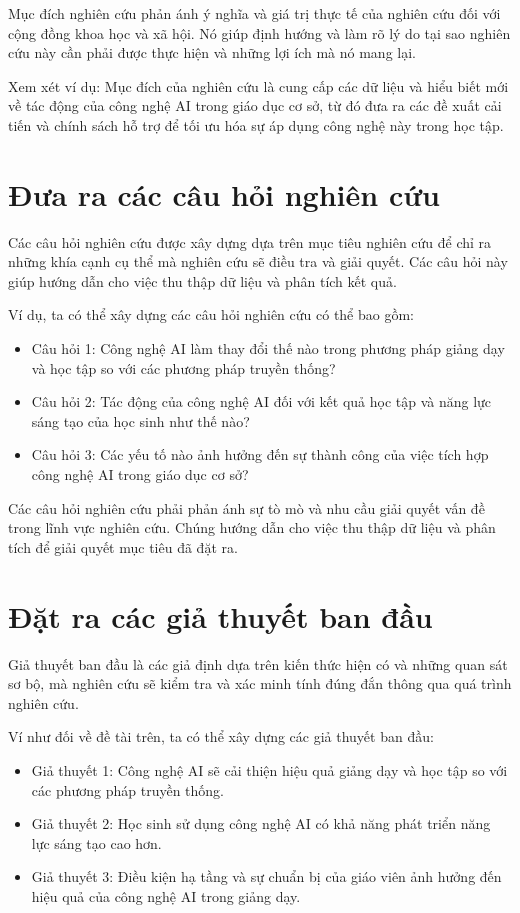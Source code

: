 Mục đích nghiên cứu phản ánh ý nghĩa và giá trị thực tế của nghiên cứu đối với cộng đồng khoa học và xã hội. Nó giúp định hướng và làm rõ lý do tại sao nghiên cứu này cần phải được thực hiện và những lợi ích mà nó mang lại.

Xem xét ví dụ: Mục đích của nghiên cứu là cung cấp các dữ liệu và hiểu biết mới về tác động của công nghệ AI trong giáo dục cơ sở, từ đó đưa ra các đề xuất cải tiến và chính sách hỗ trợ để tối ưu hóa sự áp dụng công nghệ này trong học tập. 

\section{Đưa ra các câu hỏi nghiên cứu}

Các câu hỏi nghiên cứu được xây dựng dựa trên mục tiêu nghiên cứu để chỉ ra những khía cạnh cụ thể mà nghiên cứu sẽ điều tra và giải quyết. Các câu hỏi này giúp hướng dẫn cho việc thu thập dữ liệu và phân tích kết quả.

Ví dụ, ta có thể xây dựng các câu hỏi nghiên cứu có thể bao gồm:
\begin{itemize}
    \item Câu hỏi 1: Công nghệ AI làm thay đổi thế nào trong phương pháp giảng dạy và học tập so với các phương pháp truyền thống?
    \item Câu hỏi 2: Tác động của công nghệ AI đối với kết quả học tập và năng lực sáng tạo của học sinh như thế nào?
    \item Câu hỏi 3: Các yếu tố nào ảnh hưởng đến sự thành công của việc tích hợp công nghệ AI trong giáo dục cơ sở?
\end{itemize}
Các câu hỏi nghiên cứu phải phản ánh sự tò mò và nhu cầu giải quyết vấn đề trong lĩnh vực nghiên cứu. Chúng hướng dẫn cho việc thu thập dữ liệu và phân tích để giải quyết mục tiêu đã đặt ra.

\section{Đặt ra các giả thuyết ban đầu}

Giả thuyết ban đầu là các giả định dựa trên kiến thức hiện có và những quan sát sơ bộ, mà nghiên cứu sẽ kiểm tra và xác minh tính đúng đắn thông qua quá trình nghiên cứu.

Ví như đối về đề tài trên, ta có thể xây dựng các giả thuyết ban đầu:
\begin{itemize}
    \item Giả thuyết 1: Công nghệ AI sẽ cải thiện hiệu quả giảng dạy và học tập so với các phương pháp truyền thống.
    \item Giả thuyết 2: Học sinh sử dụng công nghệ AI có khả năng phát triển năng lực sáng tạo cao hơn.
    \item Giả thuyết 3: Điều kiện hạ tầng và sự chuẩn bị của giáo viên ảnh hưởng đến hiệu quả của công nghệ AI trong giảng dạy.
\end{itemize}

